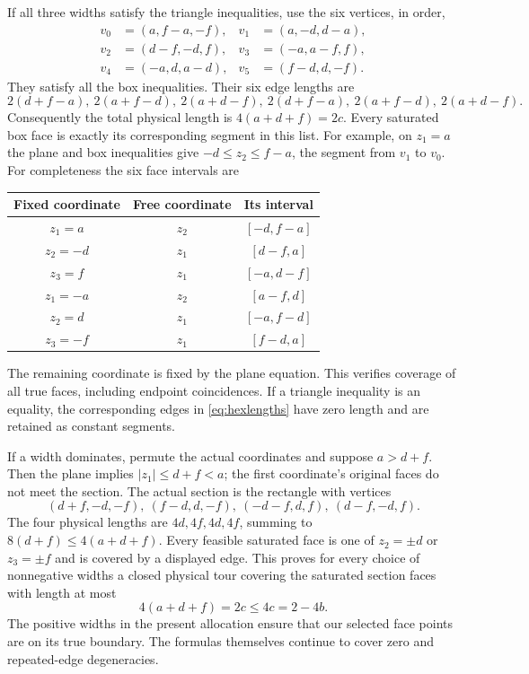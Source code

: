 \documentclass[11pt]{article}
\theoremstyle{definition}
\theoremstyle{remark}
\newcommand{\abs}[1]{\left|#1\right|}
\begin{document}
If all three widths satisfy the triangle inequalities, use the six
vertices, in order,
\begin{equation}\label{eq:hexvertices}
 \begin{aligned}
 v_0&=(a,f-a,-f),& v_1&=(a,-d,d-a),\\
 v_2&=(d-f,-d,f),& v_3&=(-a,a-f,f),\\
 v_4&=(-a,d,a-d),& v_5&=(f-d,d,-f).
 \end{aligned}
\end{equation}
They satisfy all the box inequalities. Their six edge lengths are
\begin{equation}\label{eq:hexlengths}
 2(d+f-a),\ 2(a+f-d),\ 2(a+d-f),\
 2(d+f-a),\ 2(a+f-d),\ 2(a+d-f).
\end{equation}
Consequently the total physical length is $4(a+d+f)=2c$.
Every saturated box face is exactly its corresponding segment in
this list. For example, on $z_1=a$ the plane and box inequalities
give $-d\leq z_2\leq f-a$, the segment from $v_1$ to $v_0$.
For completeness the six face intervals are
\begin{center}
\begin{tabular}{ccc}
\toprule
Fixed coordinate & Free coordinate & Its interval\\
\midrule
$z_1=a$ & $z_2$ & $[-d,f-a]$\\
$z_2=-d$ & $z_1$ & $[d-f,a]$\\
$z_3=f$ & $z_1$ & $[-a,d-f]$\\
$z_1=-a$ & $z_2$ & $[a-f,d]$\\
$z_2=d$ & $z_1$ & $[-a,f-d]$\\
$z_3=-f$ & $z_1$ & $[f-d,a]$\\
\bottomrule
\end{tabular}
\end{center}
The remaining coordinate is fixed by the plane equation. This verifies
coverage of all true faces, including endpoint coincidences. If a
triangle inequality is an equality, the corresponding edges in
\eqref{eq:hexlengths} have zero length and are retained as constant
segments.

If a width dominates, permute the actual coordinates and suppose
$a>d+f$. Then the plane implies $\abs{z_1}\leq d+f<a$; the
first coordinate's original faces do not meet the section. The actual
section is the rectangle with vertices
\begin{equation}\label{eq:dominantvertices}
 (d+f,-d,-f),\ (f-d,d,-f),\
 (-d-f,d,f),\ (d-f,-d,f).
\end{equation}
The four physical lengths are $4d,4f,4d,4f$, summing to
$8(d+f)\leq4(a+d+f)$. Every feasible saturated face is one of
$z_2=\pm d$ or $z_3=\pm f$ and is covered by a displayed edge.
This proves for every choice of nonnegative widths a closed physical
tour covering the saturated section faces with length at most
\begin{equation}\label{eq:tripleperimeter}
 4(a+d+f)=2c\leq4c=2-4b.
\end{equation}
The positive widths in the present allocation ensure that our selected
face points are on its true boundary. The formulas themselves continue
to cover zero and repeated-edge degeneracies.
\end{document}
